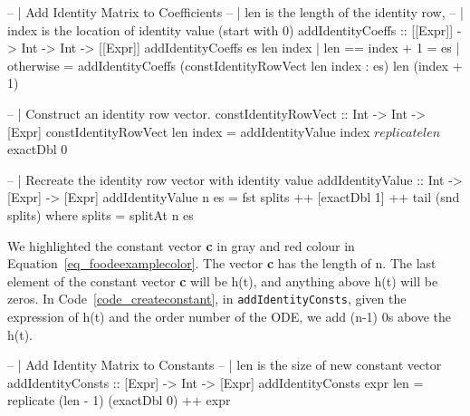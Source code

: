 \begin{listing}[ht]
\begin{haskell1}
-- | Add Identity Matrix to Coefficients
-- | len is the length of the identity row,
-- | index is the location of identity value (start with 0)
addIdentityCoeffs :: [[Expr]] -> Int -> Int -> [[Expr]]
addIdentityCoeffs es len index
  | len == index + 1 = es
  | otherwise = addIdentityCoeffs (constIdentityRowVect len index : es) len (index + 1)

-- | Construct an identity row vector.
constIdentityRowVect :: Int -> Int -> [Expr]
constIdentityRowVect len index = addIdentityValue index $ replicate len $ exactDbl 0

-- | Recreate the identity row vector with identity value 
addIdentityValue :: Int -> [Expr] -> [Expr]
addIdentityValue n es = fst splits ++ [exactDbl 1] ++ tail (snd splits)
  where splits = splitAt n es
\end{haskell1}
\label{code_createidentity}
\end{listing}

We highlighted the constant vector \textbf{c} in gray and red colour in Equation~\ref{eq_foodeexamplecolor}. The vector \textbf{c} has the length of n. The last element of the constant vector \textbf{c} will be h(t), and anything above h(t) will be zeros. In Code~\ref{code_createconstant}, in \verb|addIdentityConsts|, given the expression of h(t) and the order number of the ODE, we add (n-1) 0s above the h(t). 

\begin{listing}[ht]
\begin{haskell1}
-- | Add Identity Matrix to Constants
-- | len is the size of new constant vector
addIdentityConsts :: [Expr] -> Int -> [Expr]
addIdentityConsts expr len = replicate (len - 1) (exactDbl 0) ++ expr
\end{haskell1}
\label{code_createconstant}
\end{listing}

